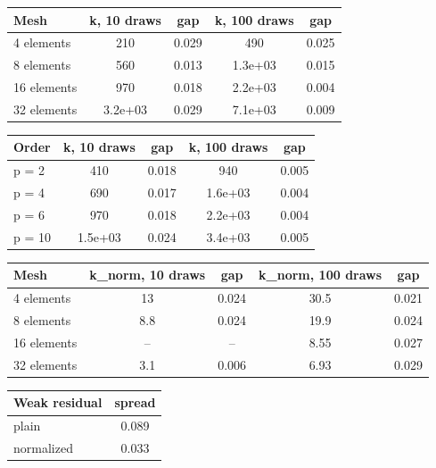 \begin{tabular}{lcccc}
\toprule
Mesh & k, 10 draws & gap & k, 100 draws & gap \\
\midrule
4 elements & 210 & 0.029 & 490 & 0.025 \\
8 elements & 560 & 0.013 & 1.3e+03 & 0.015 \\
16 elements & 970 & 0.018 & 2.2e+03 & 0.004 \\
32 elements & 3.2e+03 & 0.029 & 7.1e+03 & 0.009 \\
\bottomrule
\end{tabular}

\begin{tabular}{lcccc}
\toprule
Order & k, 10 draws & gap & k, 100 draws & gap \\
\midrule
p = 2 & 410 & 0.018 & 940 & 0.005 \\
p = 4 & 690 & 0.017 & 1.6e+03 & 0.004 \\
p = 6 & 970 & 0.018 & 2.2e+03 & 0.004 \\
p = 10 & 1.5e+03 & 0.024 & 3.4e+03 & 0.005 \\
\bottomrule
\end{tabular}

\begin{tabular}{lcccc}
\toprule
Mesh & k_norm, 10 draws & gap & k_norm, 100 draws & gap \\
\midrule
4 elements & 13 & 0.024 & 30.5 & 0.021 \\
8 elements & 8.8 & 0.024 & 19.9 & 0.024 \\
16 elements & -- & -- & 8.55 & 0.027 \\
32 elements & 3.1 & 0.006 & 6.93 & 0.029 \\
\bottomrule
\end{tabular}

\begin{tabular}{lc}
\toprule
Weak residual & spread \\
\midrule
plain & 0.089 \\
normalized & 0.033 \\
\bottomrule
\end{tabular}

